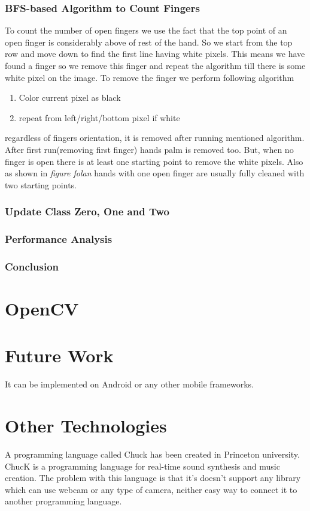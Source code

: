\documentclass{report}
\begin{document}
\subsubsection{BFS-based Algorithm to Count Fingers}
To count the number of open fingers we use the fact that the top point of an open finger is considerably above of rest of the hand. So we start from the top row and move down to find the first line having white pixels. This means we have found a finger so we remove this finger and repeat the algorithm till there is some white pixel on the image. To remove the finger we perform following algorithm \begin{enumerate}
	\item{Color current pixel as black}
	\item{repeat from left/right/bottom pixel if white}
\end{enumerate}
regardless of fingers orientation, it is removed after running mentioned algorithm. After first run(removing first finger) hands palm is removed too. But, when no finger is open there is at least one starting point to remove the white pixels. Also as shown in \textit{figure folan } hands with one open finger are usually fully cleaned with two starting points. 


\subsubsection{Update Class Zero, One and Two}


\subsubsection{Performance Analysis}

\subsubsection{Conclusion}

\section{OpenCV}

\section{Future Work}
It can be implemented on Android or any other mobile frameworks.
\section{Other Technologies}
A programming language called Chuck has been created in Princeton university. ChucK is a programming language for real-time sound synthesis and music creation. The problem with this language is that it's doesn't support any library which can use webcam or any type of camera, neither easy way to connect it to another programming language.


\end{document}
